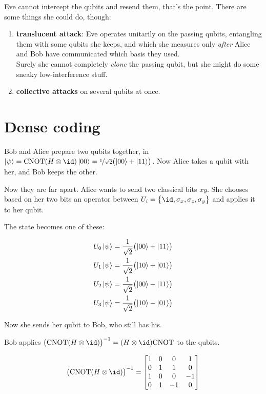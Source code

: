 \documentclass[main.tex]{subfiles}
\begin{document}
Eve cannot intercept the qubits and resend them, that's the point. There are some things she could do,  though:

\begin{enumerate}
    \item \textbf{translucent attack}: Eve operates unitarily on the passing qubits, entangling them with some qubits she keeps, and which she measures only \emph{after} Alice and Bob have communicated which basis they used. \\
    Surely she cannot completely \emph{clone} the passing qubit, but she might do some sneaky low-interference stuff.
    \item \textbf{collective attacks} on several qubits at once.
\end{enumerate}

\section{Dense coding}

Bob and Alice prepare two qubits together, in  \(\ket{\psi} = \text{CNOT} (H \otimes \id) \ket{00}  = \frac[i]{1}{\sqrt{2} } \qty(\ket{00} + \ket{11} ) \). Now Alice takes a qubit with her, and Bob keeps the other.

Now they are far apart. Alice wants to send two classical bits \(xy\). She chooses based on her two bits an operator between \(U_i = \qty{\id, \sigma_x, \sigma_z, \sigma_y}\) and applies it to her qubit.

The state becomes one of these:

\begin{subequations}
\begin{align}
  U_0 \ket\psi &= \frac{1}{\sqrt{2} } \qty(\ket{00} + \ket{11} ) \\
  U_1 \ket\psi &= \frac{1}{\sqrt{2} } \qty(\ket{10} + \ket{01} ) \\
  U_2 \ket\psi &= \frac{1}{\sqrt{2} } \qty(\ket{00} - \ket{11} ) \\
  U_3 \ket\psi &= \frac{1}{\sqrt{2} } \qty(\ket{10} - \ket{01} )
\end{align}
\end{subequations}

Now she sends her qubit to Bob, who still has his.

Bob applies \(\qty(\text{CNOT} (H \otimes \id))^{-1} = (H \otimes \id) \text{CNOT}\) to the qubits.

\begin{equation} \label{eq:cnot-hadamard-inverse}
    \qty(\text{CNOT} (H \otimes \id))^{-1}=
\left[\begin{matrix}1 & 0 & 0 & 1\\0 & 1 & 1 & 0\\1 & 0 & 0 & -1\\0 & 1 & -1 & 0\end{matrix}\right]
\end{equation}
\end{document}
